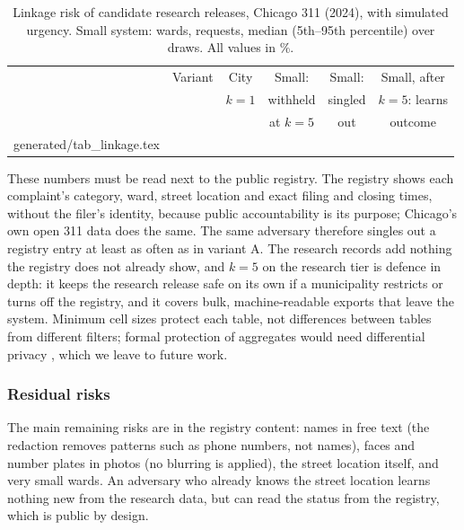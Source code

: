\documentclass{ieeeaccess}
\makeatletter
\newcommand{\tablebody}[1]{\@@input #1 }
\makeatother
\begin{document}
\begin{table}[!t]
\caption{Linkage risk of candidate research releases, Chicago 311 (2024), with simulated urgency. Small system: \nChiSampleWards{} wards, \nChiSmall{} requests, median (5th--95th percentile) over \nChiDraws{} draws. All values in \%.}
\label{tab:t7}
\centering
\footnotesize
\setlength{\tabcolsep}{6pt}
\begin{tabular}{@{}clcccc@{}}
\toprule
& Variant & City & Small: & Small: & Small, after\\
& & $k{=}1$ & withheld & singled & $k{=}5$: learns\\
& & & at $k{=}5$ & out & outcome\\
\midrule
\tablebody{generated/tab_linkage.tex}
\bottomrule
\end{tabular}
\end{table}

These numbers must be read next to the public registry. The registry shows each complaint's category, ward, street location and exact filing and closing times, without the filer's identity, because public accountability is its purpose; Chicago's own open 311 data does the same. The same adversary therefore singles out a registry entry at least as often as in variant A. The research records add nothing the registry does not already show, and $k=5$ on the research tier is defence in depth: it keeps the research release safe on its own if a municipality restricts or turns off the registry, and it covers bulk, machine-readable exports that leave the system. Minimum cell sizes protect each table, not differences between tables from different filters; formal protection of aggregates would need differential privacy \cite{b42}, which we leave to future work.

\subsubsection{Residual risks}
The main remaining risks are in the registry content: names in free text (the redaction removes patterns such as phone numbers, not names), faces and number plates in photos (no blurring is applied), the street location itself, and very small wards. An adversary who already knows the street location learns nothing new from the research data, but can read the status from the registry, which is public by design.
\end{document}
